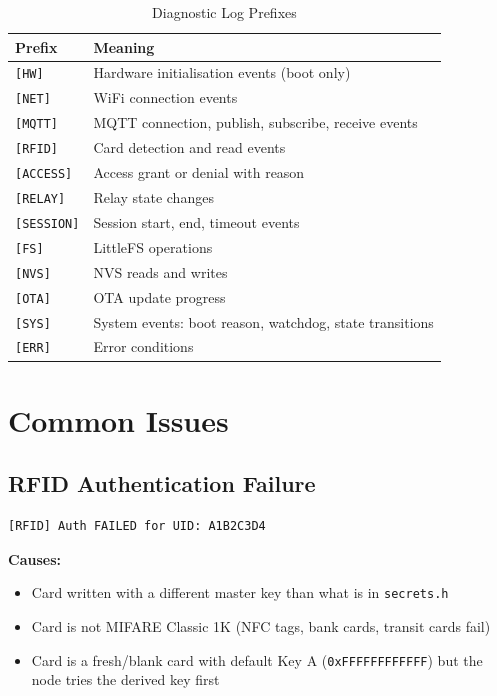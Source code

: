 \begin{table}[H]
\centering
\caption{Diagnostic Log Prefixes}
\begin{tabular}{L{2.5cm}L{11cm}}
\toprule
\textbf{Prefix} & \textbf{Meaning} \\
\midrule
\texttt{[HW]} & Hardware initialisation events (boot only) \\
\texttt{[NET]} & WiFi connection events \\
\texttt{[MQTT]} & MQTT connection, publish, subscribe, receive events \\
\texttt{[RFID]} & Card detection and read events \\
\texttt{[ACCESS]} & Access grant or denial with reason \\
\texttt{[RELAY]} & Relay state changes \\
\texttt{[SESSION]} & Session start, end, timeout events \\
\texttt{[FS]} & LittleFS operations \\
\texttt{[NVS]} & NVS reads and writes \\
\texttt{[OTA]} & OTA update progress \\
\texttt{[SYS]} & System events: boot reason, watchdog, state transitions \\
\texttt{[ERR]} & Error conditions \\
\bottomrule
\end{tabular}
\end{table}

\section{Common Issues}

\subsection{RFID Authentication Failure}

\begin{verbatim}
[RFID] Auth FAILED for UID: A1B2C3D4
\end{verbatim}

\textbf{Causes:}
\begin{itemize}[leftmargin=1.5em,noitemsep]
    \item Card written with a different master key than what is in \texttt{secrets.h}
    \item Card is not MIFARE Classic 1K (NFC tags, bank cards, transit cards fail)
    \item Card is a fresh/blank card with default Key A (\texttt{0xFFFFFFFFFFFF}) but the node tries the derived key first
\end{itemize}


